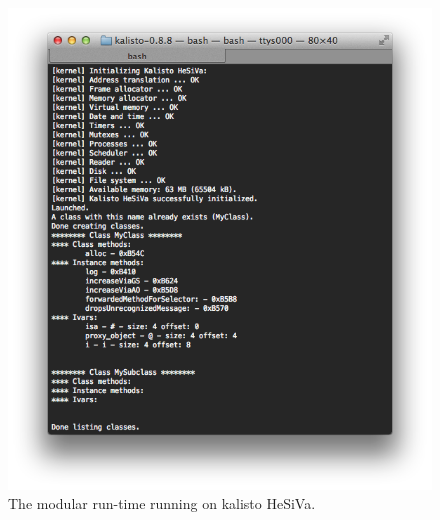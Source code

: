 \begin{figure}[H]
  \includegraphics[width=\textwidth]{img/hesiva.png}
  
  \centering{}
  \caption{The modular run-time running on kalisto HeSiVa.}
  \label{fig:hesiva_run}
\end{figure}

